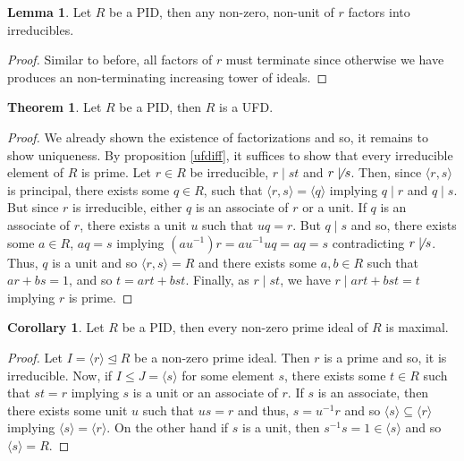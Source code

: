 \documentclass[]{article}
\theoremstyle{definition}
\newtheorem{theorem}{Theorem}
\newtheorem{corollary}{Corollary}[theorem]
\theoremstyle{definition}
\newtheorem{lemma}{Lemma}[section]
\begin{document}
\begin{lemma}
  Let \(R\) be a PID, then any non-zero, non-unit of \(r\) factors into 
  irreducibles.
\end{lemma}
\begin{proof}
  Similar to before, all factors of \(r\) must terminate since otherwise we 
  have produces an non-terminating increasing tower of ideals.
\end{proof}

\begin{theorem}
  Let \(R\) be a PID, then \(R\) is a UFD.
\end{theorem}
\begin{proof}
  We already shown the existence of factorizations and so, it remains to show 
  uniqueness. By proposition \ref{ufdiff}, it suffices to show that every 
  irreducible element of \(R\) is prime. Let \(r \in R\) be irreducible, 
  \(r \mid st\) and \(r \not\mid s\). Then, since \(\langle r, s \rangle\) is 
  principal, there exists some \(q \in R\), such that 
  \(\langle r, s \rangle = \langle q \rangle\) implying \(q \mid r\) and 
  \(q \mid s\). But since \(r\) is irreducible, either \(q\) is an associate 
  of \(r\) or a unit. If \(q\) is an associate of \(r\), there exists a 
  unit \(u\) such that \(uq = r\). But \(q \mid s\) and so, there exists some 
  \(a \in R\), \(aq = s\) implying \((au^{-1})r = au^{-1}uq = aq = s\) 
  contradicting \(r \not\mid s\). Thus, \(q\) is a unit and so 
  \(\langle r, s \rangle = R\) and there exists some \(a, b \in R\) such that 
  \(ar + bs = 1\), and so \(t = art + bst\). Finally, as \(r \mid st\), we have 
  \(r \mid art + bst = t\) implying \(r\) is prime.
\end{proof}

\begin{corollary}
  Let \(R\) be a PID, then every non-zero prime ideal of \(R\) is maximal.
\end{corollary}
\begin{proof}
  Let \(I = \langle r \rangle \trianglelefteq R\) be a non-zero prime ideal. 
  Then \(r\) is a prime and so, it is irreducible. Now, if 
  \(I \le J = \langle s \rangle\) for some element \(s\), there exists some 
  \(t \in R\) such that \(st = r\) implying \(s\) is a unit or an associate of 
  \(r\). If \(s\) is an associate, then there exists some unit \(u\) such that 
  \(us = r\) and thus, \(s = u^{-1}r\) and so 
  \(\langle s \rangle \subseteq \langle r \rangle\) implying
  \(\langle s \rangle =\langle r \rangle\). On the other hand if 
  \(s\) is a unit, then \(s^{-1}s = 1 \in \langle s \rangle\) and so 
  \(\langle s \rangle = R\). 
\end{proof}
\end{document}
